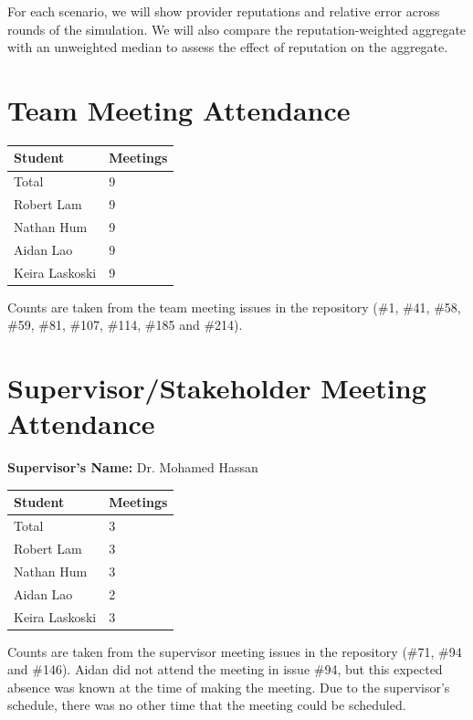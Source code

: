\documentclass{article}
\begin{document}
For each scenario, we will show provider reputations and relative
error across rounds of the simulation. We will also compare the reputation-weighted
aggregate with an unweighted median to assess the effect of reputation on the aggregate.

\section{Team Meeting Attendance}

\begin{table}[H]
\centering
\begin{tabular}{ll}
\toprule
\textbf{Student} & \textbf{Meetings}\\
\midrule
Total & 9\\
Robert Lam & 9\\
Nathan Hum & 9\\
Aidan Lao & 9\\
Keira Laskoski & 9\\
\bottomrule
\end{tabular}
\end{table}

Counts are taken from the team meeting issues in the repository (\#1, \#41,
\#58, \#59, \#81, \#107, \#114, \#185 and \#214).

\section{Supervisor/Stakeholder Meeting Attendance}

\noindent \textbf{Supervisor's Name: } Dr. Mohamed Hassan

\begin{table}[H]
\centering
\begin{tabular}{ll}
\toprule
\textbf{Student} & \textbf{Meetings}\\
\midrule
Total & 3\\
Robert Lam & 3\\
Nathan Hum & 3\\
Aidan Lao & 2\\
Keira Laskoski & 3\\
\bottomrule
\end{tabular}
\end{table}

Counts are taken from the supervisor meeting issues in the repository (\#71,
\#94 and \#146). Aidan did not attend the meeting in issue \#94, but this expected absence was 
known at the time of making the meeting. Due to the supervisor's schedule, there was no
other time that the meeting could be scheduled.
\end{document}
